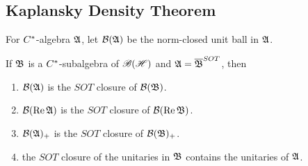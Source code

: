 \subsection{Kaplansky Density Theorem}

For $C^{*}$-algebra $\mathfrak{A}$, let $\mathcal{B}(\mathfrak{A})$ be the norm-closed unit ball in $\mathfrak{A}$.

\begin{thm}
	If $\mathfrak{B}$ is a $C^{*}$-subalgebra of $\mathscr{B(H)}$ and $\mathfrak{A} = \overline{\mathfrak{B}}^{SOT}$, then 
	\begin{enumerate}[label = \arabic*)]
		\item $\mathcal{B}(\mathfrak{A})$ is the $SOT$ closure of $\mathcal{B}(\mathfrak{B})$.
		\item $\mathcal{B}(\operatorname{Re}{\mathfrak{A}})$ is the $SOT$ closure of $\mathcal{B}(\operatorname{Re}{\mathfrak{B}})$.
		\item $\mathcal{B}(\mathfrak{A})_{+}$ is the $SOT$ closure of $\mathcal{B}(\mathfrak{B})_{+}$.
		\item the $SOT$ closure of the unitaries in $\mathfrak{B}$ contains the unitaries of $\mathfrak{A}$.
	\end{enumerate}
\end{thm}

